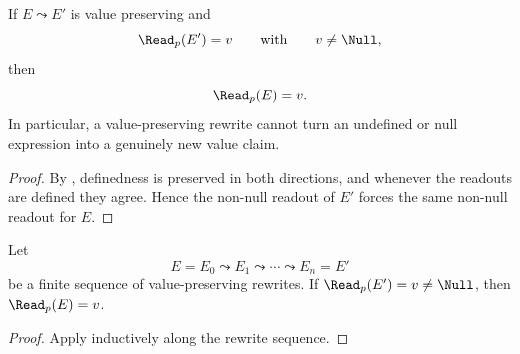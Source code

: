 \begin{proposition}\label{prop:value-preserving-no-creation}
If $E\leadsto E'$ is value preserving and
\[
\Read_p(E')=v
\qquad\text{with}\qquad
v\neq \Null,
\]
then
\[
\Read_p(E)=v.
\]
In particular, a value-preserving rewrite cannot turn an undefined or null expression into a genuinely new value claim.
\end{proposition}

\begin{proof}
By , definedness is preserved in both directions, and whenever the readouts are defined they agree. Hence the non-null readout of $E'$ forces the same non-null readout for $E$.
\end{proof}

\begin{corollary}\label{cor:normalization-no-fact-creation}
Let
\[
E=E_0\leadsto E_1\leadsto\cdots\leadsto E_n=E'
\]
be a finite sequence of value-preserving rewrites. If $\Read_p(E')=v\neq \Null$, then $\Read_p(E)=v$.
\end{corollary}

\begin{proof}
Apply  inductively along the rewrite sequence.
\end{proof}
